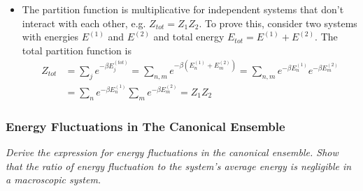 \documentclass[11pt, a4paper]{article}
\begin{document}
\begin{itemize}
	\item The partition function is multiplicative for independent systems that don't interact with each other, e.g. $ Z_{tot} = Z_{1}Z_{2} $. To prove this, consider two systems with energies $ E^{(1)} $ and $ E^{(2)} $ and total energy $ E_{tot} =  E^{(1)} + E^{(2)} $. The total partition function is 
	\begin{align*}
		Z_{tot} &= \sum_{j} e^{-\beta E^{(tot)}_{j}} = \sum_{n, m}e^{-\beta (E^{(1)}_{n} + E^{(2)}_{m} )} = \sum_{n, m}e^{-\beta E^{(1)}_{n}}e^{-\beta E^{(2)}_{m}}\\
		&=\sum_{n}e^{-\beta E^{(1)}_{n}} \sum_{m}e^{-\beta E^{(2)}_{m}} = Z_{1}Z_{2}
	\end{align*}
\end{itemize}

\subsubsection{Energy Fluctuations in The Canonical Ensemble}
\textit{Derive the expression for energy fluctuations in the canonical ensemble. Show that the ratio of energy fluctuation to the system's average energy is negligible in a macroscopic system.}
\end{document}
